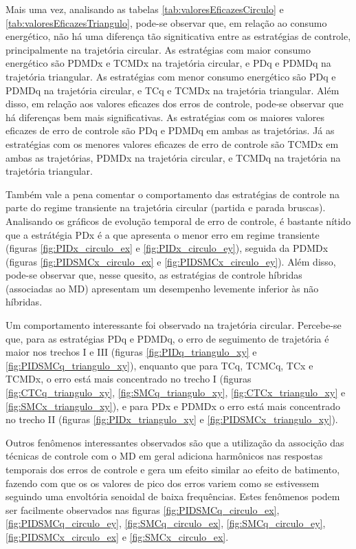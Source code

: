 \documentclass[]{politex}
\begin{document}
Mais uma vez, analisando as tabelas \ref{tab:valoresEficazesCirculo} e \ref{tab:valoresEficazesTriangulo}, pode-se observar que, em relação ao consumo energético, não há uma diferença tão signiticativa entre as estratégias de controle, principalmente na trajetória circular. As estratégias com maior consumo energético são PDMDx e TCMDx na trajetória circular, e PDq e PDMDq na trajetória triangular. As estratégias com menor consumo energético são PDq e PDMDq na trajetória circular, e TCq e TCMDx na trajetória triangular. Além disso, em relação aos valores eficazes dos erros de controle, pode-se observar que há diferenças bem mais significativas. As estratégias com os maiores valores eficazes de erro de controle são PDq e PDMDq em ambas as trajetórias. Já as estratégias com os menores valores eficazes de erro de controle são TCMDx em ambas as trajetórias, PDMDx na trajetória circular, e TCMDq na trajetória na trajetória triangular.

Também vale a pena comentar o comportamento das estratégias de controle na parte do regime transiente na trajetória circular (partida e parada bruscas). Analisando os gráficos de evolução temporal de erro de controle, é bastante nítido que a estrátégia PDx é a que apresenta o menor erro em regime transiente (figuras \ref{fig:PIDx_circulo_ex} e \ref{fig:PIDx_circulo_ey}), seguida da PDMDx (figuras \ref{fig:PIDSMCx_circulo_ex} e \ref{fig:PIDSMCx_circulo_ey}). Além disso, pode-se observar que, nesse quesito, as estratégias de controle híbridas (associadas ao MD) apresentam um desempenho levemente inferior às não híbridas.

Um comportamento interessante foi observado na trajetória circular. Percebe-se que, para as estratégias PDq e PDMDq, o erro de seguimento de trajetória é maior nos trechos I e III (figuras \ref{fig:PIDq_triangulo_xy} e \ref{fig:PIDSMCq_triangulo_xy}), enquanto que para TCq, TCMCq, TCx e TCMDx, o erro está mais concentrado no trecho I (figuras \ref{fig:CTCq_triangulo_xy}, \ref{fig:SMCq_triangulo_xy}, \ref{fig:CTCx_triangulo_xy} e \ref{fig:SMCx_triangulo_xy}), e para PDx e PDMDx o erro está mais concentrado no trecho II (figuras \ref{fig:PIDx_triangulo_xy} e \ref{fig:PIDSMCx_triangulo_xy}).

Outros fenômenos interessantes observados são que a utilização da associção das técnicas de controle com o MD em geral adiciona harmônicos nas respostas temporais dos erros de controle e gera um efeito similar ao efeito de batimento, fazendo com que os os valores de pico dos erros variem como se estivessem seguindo uma envoltória senoidal de baixa frequências. Estes fenômenos podem ser facilmente observados nas figuras \ref{fig:PIDSMCq_circulo_ex}, \ref{fig:PIDSMCq_circulo_ey}, \ref{fig:SMCq_circulo_ex}, \ref{fig:SMCq_circulo_ey}, \ref{fig:PIDSMCx_circulo_ex} e \ref{fig:SMCx_circulo_ex}.
\end{document}
